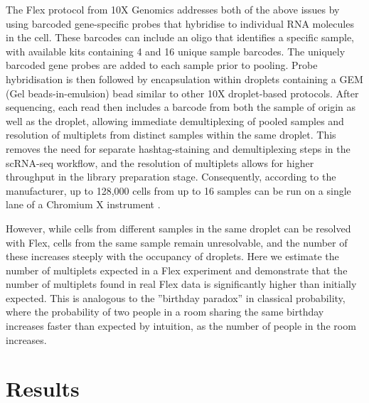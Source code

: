 \documentclass[unnumsec,webpdf,modern,large]{oup-authoring-template}
\begin{document}
	The Flex protocol from 10X Genomics addresses both of the above issues by using barcoded gene-specific probes that hybridise to individual RNA molecules in the cell. 
	These barcodes can include an oligo that identifies a specific sample, with available kits containing 4 and 16 unique sample barcodes. 
	The uniquely barcoded gene probes are added to each sample prior to pooling. 
	Probe hybridisation is then followed by encapsulation within droplets containing a GEM (Gel beads-in-emulsion) bead similar to other 10X droplet-based protocols. 
	After sequencing, each read then includes a barcode from both the sample of origin as well as the droplet, allowing immediate demultiplexing of pooled samples and resolution of multiplets from distinct samples within the same droplet. 
	This removes the need for separate hashtag-staining and demultiplexing steps in the scRNA-seq workflow, and the resolution of multiplets allows for higher throughput in the library preparation stage. 
	Consequently, according to the manufacturer, up to 128,000 cells from up to 16 samples can be run on a single lane of a Chromium X instrument 
	\citep{10X_flex_protocol}. 
	
	However, while cells from different samples in the same droplet can be resolved with Flex, cells from the same sample remain unresolvable, and the number of these increases steeply with the occupancy of droplets. 
	Here we estimate the number of multiplets expected in a Flex experiment and demonstrate that the number of multiplets found in real Flex data is significantly higher than initially expected. 
	This is analogous to the ”birthday paradox” in classical probability, where the probability of two people in a room sharing the same birthday increases faster than expected by intuition, as the number of people in the room increases.
	
	
	 	
	\section{Results}
	\label{sec:results}
	
\end{document}
